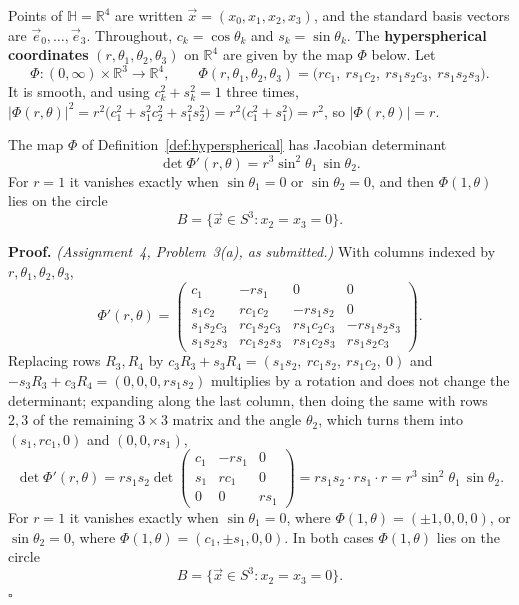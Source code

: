 \documentclass[11pt]{report}
\makeatletter
\newcounter{defcounter}[section]
\newcounter{thmcounter}[section]
\renewenvironment{proof}[1][Proof]{\noindent\textbf{#1.} }{\hfill$\square$\par\vspace{5pt}}
\newcommand{\thmlabel}[1]{\edef\@currentlabel{\arabic{section}.\arabic{thmcounter}}\label{#1}}
\newcommand{\deflabel}[1]{\edef\@currentlabel{\arabic{section}.\arabic{defcounter}}\label{#1}}
\makeatother
\begin{document}
\begin{defbox}\deflabel{def:hyperspherical}
Points of $\mathbb{H} = \mathbb{R}^4$ are written $\vec x = (x_0, x_1, x_2, x_3)$, and the standard basis vectors are $\vec e_0, \ldots, \vec e_3$. Throughout, $c_k = \cos\theta_k$ and $s_k = \sin\theta_k$. The \textbf{hyperspherical coordinates} $(r, \theta_1, \theta_2, \theta_3)$ on $\mathbb{R}^4$ are given by the map $\Phi$ below. Let
\[
\Phi : (0, \infty) \times \mathbb{R}^3 \to \mathbb{R}^4, \qquad \Phi(r, \theta_1, \theta_2, \theta_3) = \bigl( r c_1,\ r s_1 c_2,\ r s_1 s_2 c_3,\ r s_1 s_2 s_3 \bigr).
\]
It is smooth, and using $c_k^2 + s_k^2 = 1$ three times, $|\Phi(r, \theta)|^2 = r^2\bigl(c_1^2 + s_1^2 c_2^2 + s_1^2 s_2^2\bigr) = r^2\bigl(c_1^2 + s_1^2\bigr) = r^2$, so $|\Phi(r, \theta)| = r$.
\end{defbox}

\begin{lembox}\thmlabel{lem:hyperspherical-jacobian}
The map $\Phi$ of Definition~\ref{def:hyperspherical} has Jacobian determinant
\[
\det \Phi'(r, \theta) = r^3 \sin^2\theta_1 \, \sin\theta_2 .
\]
For $r = 1$ it vanishes exactly when $\sin\theta_1 = 0$ or $\sin\theta_2 = 0$, and then $\Phi(1, \theta)$ lies on the circle
\[
B = \{ \vec x \in S^3 : x_2 = x_3 = 0 \}.
\]
\end{lembox}

\begin{proof}
\textit{(Assignment~4, Problem~3(a), as submitted.)} With columns indexed by $r, \theta_1, \theta_2, \theta_3$,
\[
\Phi'(r, \theta) = \begin{pmatrix}
c_1 & -r s_1 & 0 & 0 \\
s_1 c_2 & r c_1 c_2 & -r s_1 s_2 & 0 \\
s_1 s_2 c_3 & r c_1 s_2 c_3 & r s_1 c_2 c_3 & -r s_1 s_2 s_3 \\
s_1 s_2 s_3 & r c_1 s_2 s_3 & r s_1 c_2 s_3 & r s_1 s_2 c_3
\end{pmatrix}.
\]
Replacing rows $R_3, R_4$ by $c_3 R_3 + s_3 R_4 = (s_1 s_2,\ r c_1 s_2,\ r s_1 c_2,\ 0)$ and $-s_3 R_3 + c_3 R_4 = (0, 0, 0, r s_1 s_2)$ multiplies by a rotation and does not change the determinant; expanding along the last column, then doing the same with rows $2, 3$ of the remaining $3 \times 3$ matrix and the angle $\theta_2$, which turns them into $(s_1, r c_1, 0)$ and $(0, 0, r s_1)$,
\[
\det \Phi'(r, \theta) = r s_1 s_2 \det \begin{pmatrix} c_1 & -r s_1 & 0 \\ s_1 & r c_1 & 0 \\ 0 & 0 & r s_1 \end{pmatrix} = r s_1 s_2 \cdot r s_1 \cdot r = r^3 \sin^2\theta_1 \, \sin\theta_2 .
\]
For $r = 1$ it vanishes exactly when $\sin\theta_1 = 0$, where $\Phi(1, \theta) = (\pm 1, 0, 0, 0)$, or $\sin\theta_2 = 0$, where $\Phi(1, \theta) = (c_1, \pm s_1, 0, 0)$. In both cases $\Phi(1, \theta)$ lies on the circle
\[
B = \{ \vec x \in S^3 : x_2 = x_3 = 0 \}.
\]
\end{proof}
\end{document}
